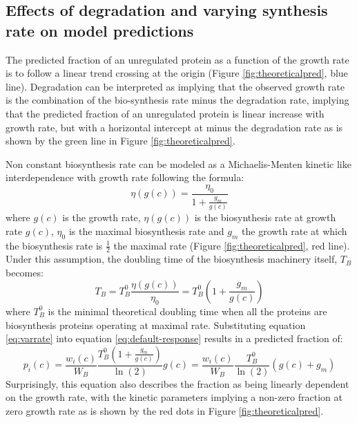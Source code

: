\subsection{Effects of degradation and varying synthesis rate on model predictions}
\label{theoreticalintercep}
The predicted fraction of an unregulated protein as a function of the growth rate is to follow a linear trend crossing at the origin (Figure \ref{fig:theoreticalpred}, blue line).
Degradation can be interpreted as implying that the observed growth rate is the combination of the bio-synthesis rate minus the degradation rate, implying that the predicted fraction of an unregulated protein is linear increase with growth rate, but with a horizontal intercept at minus the degradation rate as is shown by the green line in Figure \ref{fig:theoreticalpred}.

Non constant biosynthesis rate can be modeled as a Michaelis-Menten kinetic like interdependence with growth rate following the formula:
\begin{equation}
\eta(g(c))=\frac{\eta_0}{1+\frac{g_m}{g(c)}}
\end{equation}
where $g(c)$ is the growth rate, $\eta(g(c))$ is the biosynthesis rate at growth rate $g(c)$, $\eta_0$ is the maximal biosynthesis rate and $g_m$ the growth rate at which the biosynthesis rate is $\frac{1}{2}$ the maximal rate (Figure \ref{fig:theoreticalpred}, red line).
Under this assumption, the doubling time of the biosynthesis machinery itself, $T_B$ becomes:
\begin{equation}
\label{eq:varrate}
T_B=T_B^0\frac{\eta(g(c))}{\eta_0}=T_B^0(1+\frac{g_m}{g(c)})
\end{equation}
where $T_B^0$ is the minimal theoretical doubling time when all the proteins are biosynthesis proteins operating at maximal rate.
Substituting equation \ref{eq:varrate} into equation \ref{eq:default-response} results in a predicted fraction of:
\begin{equation}
p_i(c)=\frac{w_i(c)}{W_B}\frac{T_B^0(1+\frac{g_m}{g(c)})}{\ln(2)}g(c) = \frac{w_i(c)}{W_B}\frac{T_B^0}{\ln(2)}(g(c)+g_m)
\end{equation}
Surprisingly, this equation also describes the fraction as being linearly dependent on the growth rate, with the kinetic parameters implying a non-zero fraction at zero growth rate as is shown by the red dots in Figure \ref{fig:theoreticalpred}.
